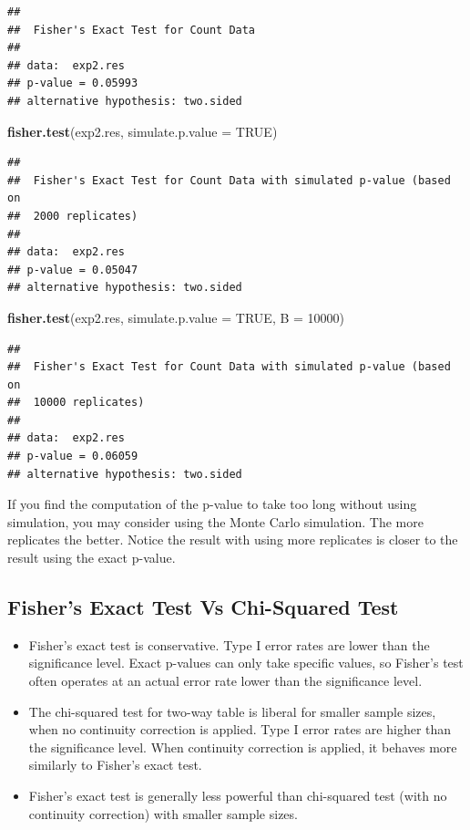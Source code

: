 \documentclass[
]{book}
\newenvironment{Shaded}{\begin{snugshade}}{\end{snugshade}}
\newcommand{\AttributeTok}[1]{\textcolor[rgb]{0.13,0.29,0.53}{#1}}
\newcommand{\ConstantTok}[1]{\textcolor[rgb]{0.56,0.35,0.01}{#1}}
\newcommand{\DecValTok}[1]{\textcolor[rgb]{0.00,0.00,0.81}{#1}}
\newcommand{\FunctionTok}[1]{\textcolor[rgb]{0.13,0.29,0.53}{\textbf{#1}}}
\newcommand{\NormalTok}[1]{#1}
\providecommand{\tightlist}{%
  \setlength{\itemsep}{0pt}\setlength{\parskip}{0pt}}
\theoremstyle{definition}
\theoremstyle{definition}
\theoremstyle{definition}
\theoremstyle{definition}
\theoremstyle{remark}
\begin{document}
\begin{verbatim}
## 
##  Fisher's Exact Test for Count Data
## 
## data:  exp2.res
## p-value = 0.05993
## alternative hypothesis: two.sided
\end{verbatim}

\begin{Shaded}
\begin{Highlighting}[]
\FunctionTok{fisher.test}\NormalTok{(exp2.res, }\AttributeTok{simulate.p.value =} \ConstantTok{TRUE}\NormalTok{)}
\end{Highlighting}
\end{Shaded}

\begin{verbatim}
## 
##  Fisher's Exact Test for Count Data with simulated p-value (based on
##  2000 replicates)
## 
## data:  exp2.res
## p-value = 0.05047
## alternative hypothesis: two.sided
\end{verbatim}

\begin{Shaded}
\begin{Highlighting}[]
\FunctionTok{fisher.test}\NormalTok{(exp2.res, }\AttributeTok{simulate.p.value =} \ConstantTok{TRUE}\NormalTok{, }\AttributeTok{B =} \DecValTok{10000}\NormalTok{)}
\end{Highlighting}
\end{Shaded}

\begin{verbatim}
## 
##  Fisher's Exact Test for Count Data with simulated p-value (based on
##  10000 replicates)
## 
## data:  exp2.res
## p-value = 0.06059
## alternative hypothesis: two.sided
\end{verbatim}

If you find the computation of the p-value to take too long without using simulation, you may consider using the Monte Carlo simulation. The more replicates the better. Notice the result with using more replicates is closer to the result using the exact p-value.

\hypertarget{fishers-exact-test-vs-chi-squared-test}{%
\subsection{Fisher's Exact Test Vs Chi-Squared Test}\label{fishers-exact-test-vs-chi-squared-test}}

\begin{itemize}
\tightlist
\item
  Fisher's exact test is conservative. Type I error rates are lower than the significance level. Exact p-values can only take specific values, so Fisher's test often operates at an actual error rate lower than the significance level.
\item
  The chi-squared test for two-way table is liberal for smaller sample sizes, when no continuity correction is applied. Type I error rates are higher than the significance level. When continuity correction is applied, it behaves more similarly to Fisher's exact test.
\item
  Fisher's exact test is generally less powerful than chi-squared test (with no continuity correction) with smaller sample sizes.
\end{itemize}
\end{document}
